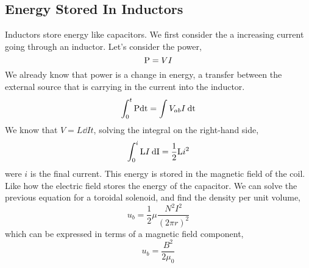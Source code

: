 \subsection{Energy Stored In Inductors}
Inductors store energy like capacitors. We first consider the a increasing current going through an inductor. Let's consider the power, 
\begin{equation*}
	\mathrm{P} = VI 
\end{equation*}
We already know that power is a change in energy, a transfer between the external source that is carrying in the current into the inductor. 
\begin{equation*}
	\int_0^t \mathrm{P} \mathrm{dt} = \int V_{ab}I \:\mathrm{dt}
\end{equation*}
We know that $V=L\dd{I}{t}$, solving the integral on the right-hand side, 
\begin{equation*}
	\int_0^i \mathrm{L}I \:\mathrm{dI} = \frac{1}{2}\mathrm{L}i^2
\end{equation*}
were $i$ is the final current. This energy is stored in the magnetic field of the coil. Like how the electric field stores the energy of the capacitor. We can solve the previous equation for a toroidal solenoid, and find the density per unit volume, 
\begin{equation*}
	u_b = \frac{1}{2}\mu\frac{N^2I^2}{(2\pi r)^2}
\end{equation*}
which can be expressed in terms of a magnetic field component, 
\begin{equation*}
	u_b = \frac{B^2}{2\mu_0}
\end{equation*}

